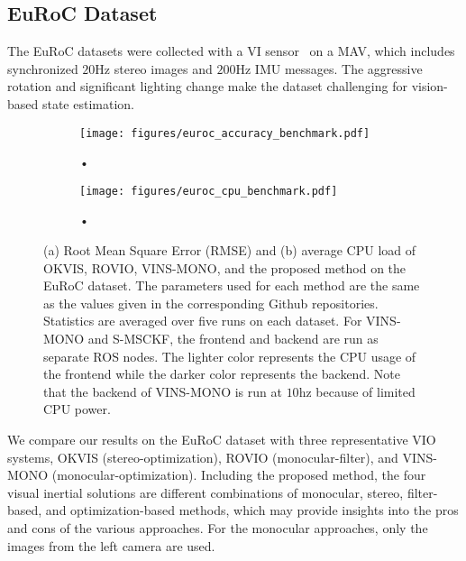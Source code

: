 \subsection{EuRoC Dataset}
\label{subsec: euroc dataset}
The EuRoC datasets were collected with a VI sensor~\cite{nikolic2014synchronized} on a MAV, which includes synchronized $20$Hz stereo images and $200$Hz IMU messages. The aggressive rotation and significant lighting change make the dataset challenging for vision-based state estimation. 
\begin{figure}[htp]
\centering
\begin{subfigure}[b]{0.4\textwidth}
\texttt{[image: figures/euroc\_accuracy\_benchmark.pdf]}
\caption{•}
\label{fig: euroc accuracy benchmark}
\end{subfigure}
\begin{subfigure}[b]{0.4\textwidth}
\texttt{[image: figures/euroc\_cpu\_benchmark.pdf]}
\caption{•}
\label{fig: euroc cpu benchmark}
\end{subfigure}
\caption{(a) Root Mean Square Error (RMSE) and (b) average CPU load of OKVIS, ROVIO, VINS-MONO, and the proposed method on the EuRoC dataset. The parameters used for each method are the same as the values given in the corresponding Github repositories. Statistics are averaged over five runs on each dataset. For VINS-MONO and S-MSCKF, the frontend and backend are run as separate ROS nodes. The lighter color represents the CPU usage of the frontend while the darker color represents the backend. Note that the backend of VINS-MONO is run at $10$hz because of limited CPU power.}
\label{fig: euroc benchmark}
\end{figure}
We compare our results on the EuRoC dataset with three representative VIO systems, OKVIS (stereo-optimization), ROVIO (monocular-filter), and VINS-MONO (monocular-optimization). Including the proposed method, the four visual inertial solutions are different combinations of monocular, stereo, filter-based, and optimization-based methods, which may provide insights into the pros and cons of the various approaches. For the monocular approaches, only the images from the left camera are used.  

